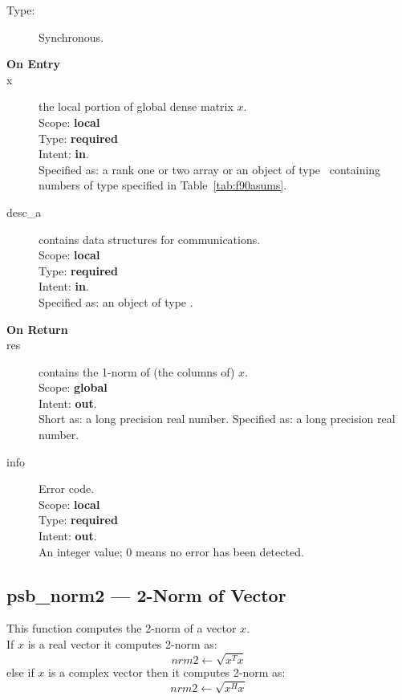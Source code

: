 \begin{description}
\item[Type:] Synchronous.
\item[\bf On Entry]
\item[x] the local portion of global dense matrix
$x$. %
\\
Scope: {\bf local} \\
Type: {\bf required} \\
Intent: {\bf in}.\\
Specified as: a rank one or two array or an object of type \vdata\
containing numbers of type specified in
Table~\ref{tab:f90asums}.
\item[desc\_a] contains data structures for communications.\\
Scope: {\bf local} \\
Type: {\bf required}\\
Intent: {\bf in}.\\
Specified as: an object of type \descdata.

\item[\bf On Return]
\item[res] contains the 1-norm of (the columns of) $x$.\\
Scope: {\bf global} \\
Intent: {\bf out}.\\
Short as: a long precision real  number.
Specified as: a long precision real  number.
\item[info] Error code.\\
Scope: {\bf local} \\
Type: {\bf required} \\
Intent: {\bf out}.\\
An integer value; 0 means no error has been detected.
\end{description}


%
%


\clearpage\subsection{psb\_norm2 --- 2-Norm of Vector}

This function computes the 2-norm of a vector $x$.\\
If $x$ is a  real  vector
it computes 2-norm as:
\[ nrm2 \leftarrow \sqrt{x^T x}\]
else if $x$ is a complex vector then it computes 2-norm  as:
\[ nrm2 \leftarrow \sqrt{x^H x}\]

